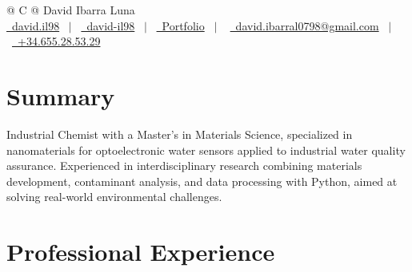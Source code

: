 \documentclass[a4paper,12pt]{article}
\begin{document}
\pagestyle{empty} 



\begin{tabularx}{\linewidth}{@{} C @{}}
\Huge{David Ibarra Luna} \\[7.5pt]
\href{https://github.com/davidil98}{\raisebox{-0.05\height}\faGithub\ david.il98} \ $|$ \ 
\href{https://www.linkedin.com/in/david-il98}{\raisebox{-0.05\height}\faLinkedin\ david-il98} \ $|$ \ 
\href{https://david-ibarra-portafolio.onrender.com/}{\raisebox{-0.05\height}\faGlobe \ Portfolio} \ $|$ \  
\href{mailto:david.ibarral0798@gmail.com}{\raisebox{-0.05\height}\faEnvelope \ david.ibarral0798@gmail.com} \ $|$ \ 
\href{tel:+34675105523}{\raisebox{-0.05\height}\faMobile \ +34.655.28.53.29} \\
\end{tabularx}


\section{Summary}
Industrial Chemist with a Master's in Materials Science, specialized in nanomaterials for optoelectronic water sensors applied to industrial water quality assurance. Experienced in interdisciplinary research combining materials development, contaminant analysis, and data processing with Python, aimed at solving real-world environmental challenges.

\section{Professional Experience}
\end{document}
